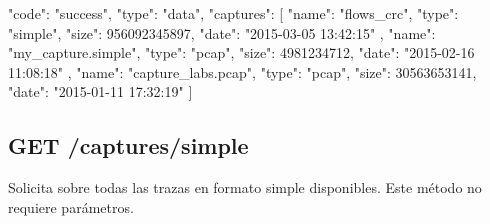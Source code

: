 \begin{itemize}
{\begin{minipage}{\textwidth}
\begin{code}[language=json]
{
  "code": "success",
  "type": "data",
  "captures": [
    {
      "name": "flows_crc",
      "type": "simple",
      "size": 956092345897,
      "date": "2015-03-05 13:42:15"
    },
    {
      "name": "my_capture.simple",
      "type": "pcap",
      "size": 4981234712,
      "date": "2015-02-16 11:08:18"
    },
    {
      "name": "capture_labs.pcap",
      "type": "pcap",
      "size": 30563653141,
      "date": "2015-01-11 17:32:19"
    }
  ]
}
\end{code}
\end{minipage}
}

\end{itemize}

%
%
\subsection{GET /captures/simple}
Solicita sobre todas las \glspl{traza} en formato \gls{simple} disponibles. Este método no requiere parámetros.

